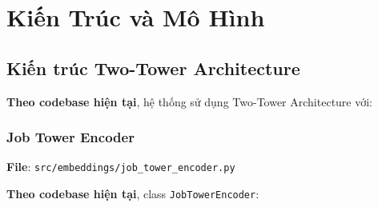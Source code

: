 \section{Kiến Trúc và Mô Hình}


\subsection{Kiến trúc Two-Tower Architecture}

\textbf{Theo codebase hiện tại}, hệ thống sử dụng Two-Tower Architecture với:

\subsubsection{Job Tower Encoder}

\textbf{File}: \texttt{src/embeddings/job\_tower\_encoder.py}

\textbf{Theo codebase hiện tại}, class \texttt{JobTowerEncoder}:

